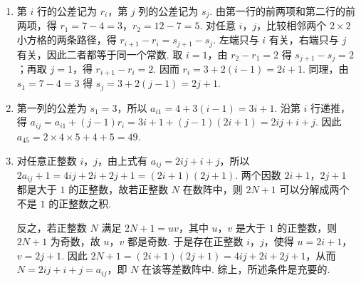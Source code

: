 \begin{solution}
\begin{enumerate}
\item 第 \(i\) 行的公差记为 \(r_i\)，第 \(j\) 列的公差记为 \(s_j\). 由第一行的前两项和第二行的前两项，得 \(r_1=7-4=3\)，\(r_2=12-7=5\). 对任意 \(i\)，\(j\)，比较相邻两个 \(2\times2\) 小方格的两条路径，得 \(r_{i+1}-r_i=s_{j+1}-s_j\). 左端只与 \(i\) 有关，右端只与 \(j\) 有关，因此二者都等于同一个常数. 取 \(i=1\)，由 \(r_2-r_1=2\) 得 \(s_{j+1}-s_j=2\)；再取 \(j=1\)，得 \(r_{i+1}-r_i=2\). 因而 \(r_i=3+2(i-1)=2i+1\). 同理，由 \(s_1=7-4=3\) 得 \(s_j=3+2(j-1)=2j+1\).
\item 第一列的公差为 \(s_1=3\)，所以 \(a_{i1}=4+3(i-1)=3i+1\). 沿第 \(i\) 行递推，得 \(a_{ij}=a_{i1}+(j-1)r_i=3i+1+(j-1)(2i+1)=2ij+i+j\). 因此 \(a_{45}=2\times4\times5+4+5=49\).
\item 对任意正整数 \(i\)，\(j\)，由上式有 \(a_{ij}=2ij+i+j\)，所以 \(2a_{ij}+1=4ij+2i+2j+1=(2i+1)(2j+1)\). 两个因数 \(2i+1\)，\(2j+1\) 都是大于 \(1\) 的正整数，故若正整数 \(N\) 在数阵中，则 \(2N+1\) 可以分解成两个不是 \(1\) 的正整数之积.

反之，若正整数 \(N\) 满足 \(2N+1=uv\)，其中 \(u\)，\(v\) 是大于 \(1\) 的正整数，则 \(2N+1\) 为奇数，故 \(u\)，\(v\) 都是奇数. 于是存在正整数 \(i\)，\(j\)，使得 \(u=2i+1\)，\(v=2j+1\). 因此 \(2N+1=(2i+1)(2j+1)=4ij+2i+2j+1\)，从而 \(N=2ij+i+j=a_{ij}\)，即 \(N\) 在该等差数阵中. 综上，所述条件是充要的.
\end{enumerate}
\end{solution}
